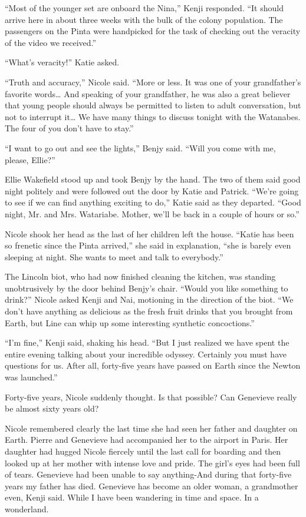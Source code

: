 \documentclass[]{article}
\begin{document}
{“Most of the younger set are onboard the Nina,” Kenji responded.  “It should arrive here in about three weeks with the bulk of the colony population.  The passengers on the Pinta were handpicked for the task of checking out the veracity of the video we received.”

“What’s veracity!” Katie asked.

“Truth and accuracy,” Nicole said.  “More or less.  It was one of your grandfather’s favorite words…  And speaking of your grandfather, he was also a great believer that young people should always be permitted to listen to adult conversation, but not to interrupt it… We have many things to discuss tonight with the Watanabes.  The four of you don’t have to stay.”

“I want to go out and see the lights,” Benjy said.  “Will you come with me, please, Ellie?”

Ellie Wakefield stood up and took Benjy by the hand.  The two of them said good night politely and were followed out the door by Katie and Patrick.  “We’re going to see if we can find anything exciting to do,” Katie said as they departed.  “Good night, Mr.  and Mrs.  Watariabe.  Mother, we’ll be back in a couple of hours or so.”

Nicole shook her head as the last of her children left the house.  “Katie has been so frenetic since the Pinta arrived,” she said in explanation, “she is barely even sleeping at night.  She wants to meet and talk to everybody.”

The Lincoln biot, who had now finished cleaning the kitchen, was standing unobtrusively by the door behind Benjy’s chair.  “Would you like something to drink?” Nicole asked Kenji and Nai, motioning in the direction of the biot.  “We don’t have anything as delicious as the fresh fruit drinks that you brought from Earth, but Line can whip up some interesting synthetic concoctions.”

“I’m fine,” Kenji said, shaking his head.  “But I just realized we have spent the entire evening talking about your incredible odyssey.  Certainly you must have questions for us.  After all, forty-five years have passed on Earth since the Newton was launched.”

Forty-five years, Nicole suddenly thought.  Is that possible? Can Genevieve really be almost sixty years old?

Nicole remembered clearly the last time she had seen her father and daughter on Earth.  Pierre and Genevieve had accompanied her to the airport in Paris.  Her daughter had hugged Nicole fiercely until the last call for boarding and then looked up at her mother with intense love and pride.  The girl’s eyes had been full of tears.  Genevieve had been unable to say anything-And during that forty-five years my father has died.  Genevieve has become an older woman, a grandmother even, Kenji said.  While I have been wandering in time and space.  In a wonderland.

}
\end{document}
